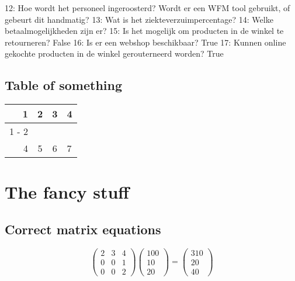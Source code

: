 \documentclass{article}%
\begin{document}
\newline%
%
\newline%
%
12: Hoe wordt het personeel ingeroosterd? Wordt er een WFM tool gebruikt, of gebeurt dit handmatig? %
\newline%
%
\newline%
%
13: Wat is het ziekteverzuimpercentage? %
\newline%
%
\newline%
%
14: Welke betaalmogelijkheden zijn er? %
\newline%
%
\newline%
%
15: Is het mogelijk om producten in de winkel te retourneren? %
\newline%
%
\newline%
%
   False%
\newline%
%
16: Is er een webshop beschikbaar? %
\newline%
%
\newline%
%
   True%
\newline%
%
17: Kunnen online gekochte producten in de winkel gerouterneerd worden? %
\newline%
%
\newline%
%
   True%
\subsection{Table of something}%
\label{subsec:Tableofsomething}%
\begin{tabular}{rc|cl}%
\hline%
1&2&3&4\\%
\cline{1%
-%
2}%
&&&\\%
4&5&6&7\\%
\end{tabular}

%
\section{The fancy stuff}%
\label{sec:Thefancystuff}%
\subsection{Correct matrix equations}%
\label{subsec:Correctmatrixequations}%
\[%
\begin{pmatrix}%
2&3&4\\%
0&0&1\\%
0&0&2%
\end{pmatrix} \begin{pmatrix}%
100\\%
10\\%
20%
\end{pmatrix} = \begin{pmatrix}%
310\\%
20\\%
40%
\end{pmatrix}%
\]
\end{document}
